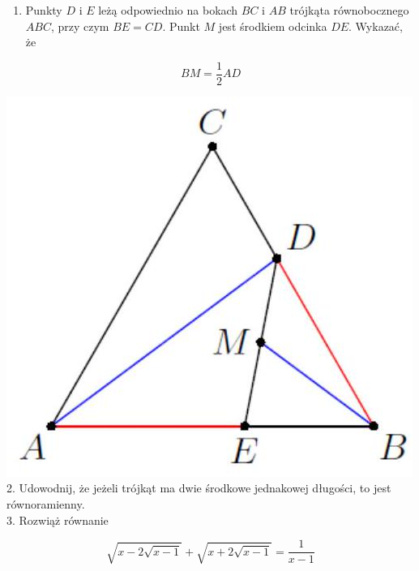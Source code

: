 \documentclass[10pt]{article}
\begin{document}
\begin{enumerate}
  \item Punkty \(D\) i \(E\) leżą odpowiednio na bokach \(B C\) i \(A B\) trójkąta równobocznego \(A B C\), przy czym \(B E=C D\). Punkt \(M\) jest środkiem odcinka \(D E\). Wykazać, że
\end{enumerate}

\[
B M=\frac{1}{2} A D
\]

\includegraphics[max width=\textwidth, center]{2024_11_21_b24afab5947f4ac78933g-1}\\
2. Udowodnij, że jeżeli trójkąt ma dwie środkowe jednakowej długości, to jest równoramienny.\\
3. Rozwiąż równanie

\[
\sqrt{x-2 \sqrt{x-1}}+\sqrt{x+2 \sqrt{x-1}}=\frac{1}{x-1}
\]
\end{document}
